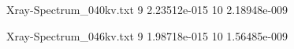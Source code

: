 \documentclass{article}
\begin{document}
\begin{filecontents*}{Xray-Spectrum_040kv.txt}
9 2.23512e-015
10 2.18948e-009
\end{filecontents*}

\begin{filecontents*}{Xray-Spectrum_046kv.txt}
9 1.98718e-015
10 1.56485e-009
\end{filecontents*}

\end{document}
